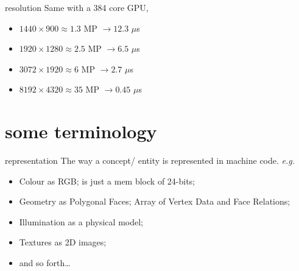 \documentclass[aspectratio=169,xcolor={dvipsnames,svgnames}]{beamer}
\begin{document}
\begin{frame}[label={sec:org20c22f5}]{resolution}
Same with a 384 core GPU,

\begin{itemize}
\item \(1440\times900\approx1.3\) MP \(\to 12.3\) \(\mu\)s
\item \(1920\times1280\approx2.5\) MP \(\to 6.5\) \(\mu\)s
\item \(3072\times1920\approx6\) MP \(\to 2.7\) \(\mu\)s
\item \(8192\times4320\approx35\) MP \(\to 0.45\) \(\mu\)s
\end{itemize}
\end{frame}

\section{some terminology}
\label{sec:org475dbff}

\begin{frame}[label={sec:org0ae95fb}]{representation}
The way a concept/ entity is represented in machine
code. \emph{e.g.}

\begin{itemize}
\item Colour as \alert{RGB}; is just a mem block of 24-bits;
\item Geometry as \alert{Polygonal Faces}; Array of Vertex Data
and Face Relations;
\item Illumination as a physical model;
\item Textures as 2D images;
\item and so forth\ldots
\end{itemize}
\end{frame}
\end{document}
